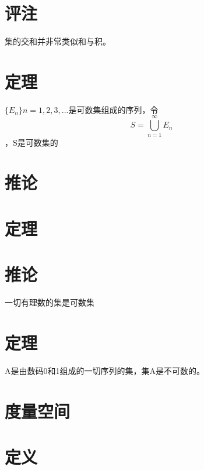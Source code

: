 \section{评注}集的交和并非常类似和与积。
\section{定理}$\{E_n\} n=1,2,3,...$是可数集组成的序列，令$$ S=\bigcup_{n=1}^{\infty}E_n$$，S是可数集的
\section*{推论}
\section{定理} 
\section*{推论}一切有理数的集是可数集
\section{定理}A是由数码0和1组成的一切序列的集，集A是不可数的。
\section*{度量空间}
\section{定义}
\section{}
\section{}
\section{}
\section{}
\section{}
\section{}
